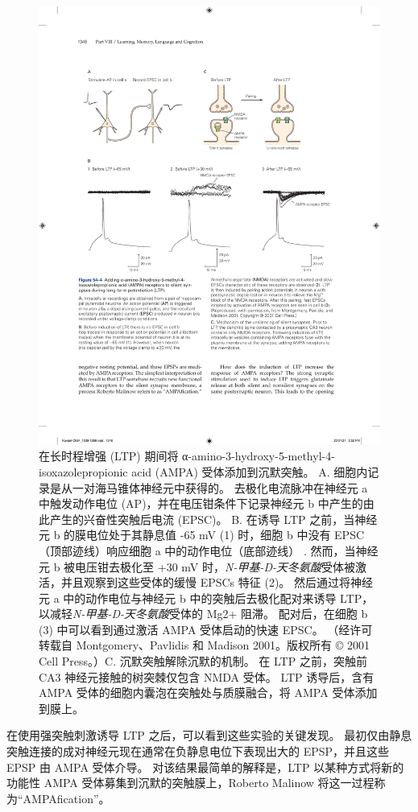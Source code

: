\begin{figure}[htbp]
	\centering
	\includegraphics[width=0.85\linewidth]{chap54/fig_54_4}
	\caption{在长时程增强 (LTP) 期间将 α-amino-3-hydroxy-5-methyl-4-isoxazolepropionic acid (AMPA) 受体添加到沉默突触。 A. 细胞内记录是从一对海马锥体神经元中获得的。 去极化电流脉冲在神经元 a 中触发动作电位 (AP)，并在电压钳条件下记录神经元 b 中产生的由此产生的兴奋性突触后电流 (EPSC)。 B. 在诱导 LTP 之前，当神经元 b 的膜电位处于其静息值 -65 mV (1) 时，细胞 b 中没有 EPSC（顶部迹线）响应细胞 a 中的动作电位（底部迹线） . 然而，当神经元 b 被电压钳去极化至 +30 mV 时，\textit{N-甲基-D-天冬氨酸}受体被激活，并且观察到这些受体的缓慢 EPSCs 特征 (2)。 然后通过将神经元 a 中的动作电位与神经元 b 中的突触后去极化配对来诱导 LTP，以减轻\textit{N-甲基-D-天冬氨酸}受体的 Mg2+ 阻滞。 配对后，在细胞 b (3) 中可以看到通过激活 AMPA 受体启动的快速 EPSC。 （经许可转载自 Montgomery、Pavlidis 和 Madison 2001。版权所有 © 2001 Cell Press。）C. 沉默突触解除沉默的机制。 在 LTP 之前，突触前 CA3 神经元接触的树突棘仅包含 NMDA 受体。 LTP 诱导后，含有 AMPA 受体的细胞内囊泡在突触处与质膜融合，将 AMPA 受体添加到膜上。}
	\label{fig:54_4}
\end{figure}


在使用强突触刺激诱导 LTP 之后，可以看到这些实验的关键发现。
最初仅由静息突触连接的成对神经元现在通常在负静息电位下表现出大的 EPSP，并且这些 EPSP 由 AMPA 受体介导。
对该结果最简单的解释是，LTP 以某种方式将新的功能性 AMPA 受体募集到沉默的突触膜上，Roberto Malinow 将这一过程称为“AMPAfication”。


